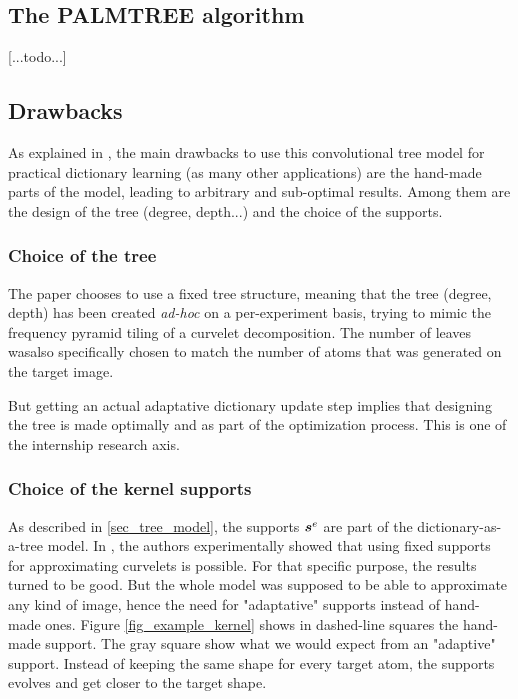 \subsection{The PALMTREE algorithm}
[...todo...]

\subsection{Drawbacks}
As explained in \cite[p. 23]{chabiron_optimization_2016}, the main drawbacks to use this convolutional tree model for practical dictionary learning (as many other applications) are the hand-made parts of the model, leading to arbitrary and sub-optimal results. Among them are the design of the tree (degree, depth...) and the choice of the supports. %
\subsubsection{Choice of the tree}
The paper chooses to use a fixed tree structure, meaning that the tree (degree, depth) has been created \emph{ad-hoc} on a per-experiment basis, trying to mimic the frequency pyramid tiling of a curvelet decomposition. The number of leaves wasalso specifically chosen to match the number of atoms that was generated on the target image.

But getting an actual adaptative dictionary update step implies that designing the tree is made optimally and as part of the optimization process. This is one of the internship research axis.

\subsubsection{Choice of the kernel supports}

As described in \ref{sec_tree_model}, the supports $\bm{s}^e$ are part of the dictionary-as-a-tree model. In \cite{chabiron_toward_2015}, the authors experimentally showed that using fixed supports for approximating curvelets is possible. For that specific purpose, the results turned to be good. But the whole model was supposed to be able to approximate any kind of image, hence the need for "adaptative" supports instead of hand-made ones. Figure \ref{fig_example_kernel} shows in dashed-line squares the hand-made support. The gray square show what we would expect from an "adaptive" support. Instead of keeping the same shape for every target atom, the supports evolves and get closer to the target shape.

